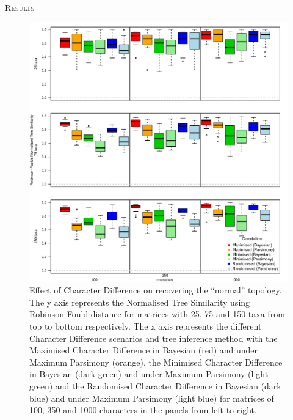 \documentclass[12pt,letterpaper]{article}
\renewcommand{\section}[1]{%
\bigskip
\begin{center}
\begin{Large}
\normalfont\scshape #1
\medskip
\end{Large}
\end{center}}
\begin{document}
\section{Results}


\begin{figure}[!htbp]
\centering
   \includegraphics[width=1\textwidth]{Figures/RF_results_best.pdf}
\caption{\small{Effect of Character Difference on recovering the ``normal'' topology. The y axis represents the Normalised Tree Similarity using Robinson-Fould distance for matrices with 25, 75 and 150 taxa from top to bottom respectively. The x axis represents the different Character Difference scenarios and tree inference method with the Maximised Character Difference in Bayesian (red) and under Maximum Parsimony (orange), the Minimised Character Difference in Bayesian (dark green) and under Maximum Parsimony (light green) and the Randomised Character Difference in Bayesian (dark blue) and under Maximum Parsimony (light blue) for matrices of 100, 350 and 1000 characters in the panels from left to right.}}
\label{Fig:RF_results_best}
\end{figure}
\end{document}
